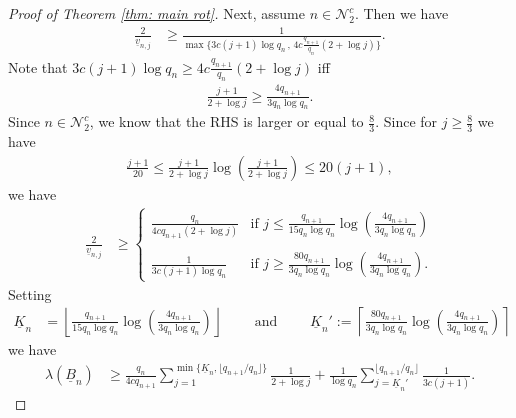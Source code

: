 \documentclass[11pt]{amsart}
\theoremstyle{definition}
\numberwithin{equation}{section}
\begin{document}
\begin{proof}[Proof of Theorem \ref{thm: main rot}]
Next, assume $n\in \mathcal{N}_2^c$.
Then we have 
\begin{align*}
 \frac{2}{\underline{v}_{n,j}}
 &\geq \frac{1}{\max\{3c(j+1) \log q_n\, ,\,  4c\frac{q_{n+1}}{q_n} (2+\log j)\}}.
\end{align*}
Note that $3c(j+1) \log q_n\geq  4c\frac{q_{n+1}}{q_n} (2+\log j)$ iff 
\begin{align*}
 \frac{j+1}{2+\log j}\geq  \frac{4 q_{n+1}}{3 q_n\log q_n}. 
\end{align*}
Since $n\in \mathcal{N}_2^c$, we know that the RHS is larger or equal to $\frac{8}{3}$. Since for $j\geq \frac{8}{3}$ we have 
\begin{align*}
 \frac{j+1}{20}\leq \frac{j+1}{2+\log j} \log \left(\frac{j+1}{2+\log j}\right)\leq  20(j+1), 
\end{align*}
we have 
\begin{align*}
 \frac{2}{\underline{v}_{n,j}}
 &\geq
 \begin{cases}
   \frac{q_n}{ 4cq_{n+1} (2+\log j)}    &\text{if } j\leq \frac{ q_{n+1}}{15 q_n\log q_n}\log\left( \frac{4 q_{n+1}}{3 q_n\log q_n}\right)\\
   \\
   \frac{1}{3c(j+1) \log q_n}    &\text{if } j\geq \frac{80 q_{n+1}}{3 q_n\log q_n}\log\left( \frac{4 q_{n+1}}{3 q_n\log q_n}\right).
 \end{cases}
\end{align*}
Setting 
\begin{align*}
 \underline{K}_n&=\left\lfloor \frac{ q_{n+1}}{15 q_n\log q_n}\log\left( \frac{4 q_{n+1}}{3 q_n\log q_n}\right)\right\rfloor 
\qquad\text{ and }\qquad
\underline{K}_n':=\left\lceil \frac{ 80 q_{n+1}}{3 q_n\log q_n}\log\left( \frac{4 q_{n+1}}{3 q_n\log q_n}\right)\right\rceil
\end{align*}
we have 
\begin{align}
 \lambda(\underline{B}_n)
 &\geq  \frac{q_n}{4cq_{n+1}} \sum_{j=1}^{\min \{\underline{K}_n, \lfloor q_{n+1}/q_n\rfloor\}}\frac{1}{2+\log j}
 + \frac{1}{ \log q_n}\sum_{j=\underline{K}_n'}^{\lfloor q_{n+1}/q_n\rfloor}\frac{1}{3c(j+1)}. \label{eq: lambda lower B 2nd case}
\end{align}


\end{proof}
\end{document}
